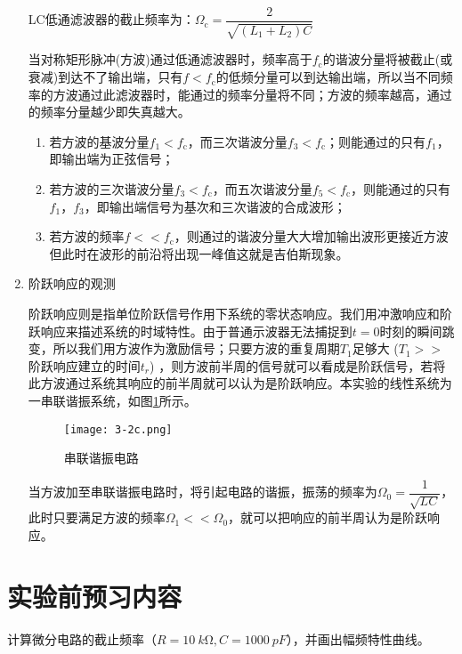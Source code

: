 \begin{enumerate}
		LC低通滤波器的截止频率为：$ \Omega_\text{c}=\dfrac{2}{\sqrt{(L_1+L_2)C}} $

		当对称矩形脉冲(方波)通过低通滤波器时，频率高于$ f_\text{c} $的谐波分量将被截止(或衰减)到达不了输出端，只有$ f<f_\text{c}  $的低频分量可以到达输出端，所以当不同频率的方波通过此滤波器时，能通过的频率分量将不同；方波的频率越高，通过的频率分量越少即失真越大。

		\begin{enumerate}
			\item 若方波的基波分量$ f_1<f_\text{c} $，而三次谐波分量$ f_3<f_\text{c} $；则能通过的只有$ f_1 $，即输出端为正弦信号；
			\item 若方波的三次谐波分量$ f_3<f_\text{c} $，而五次谐波分量$ f_5<f_\text{c} $，则能通过的只有$ f_1 $，$ f_3 $，即输出端信号为基次和三次谐波的合成波形；
			\item 若方波的频率$ f<<f_\text{c} $，则通过的谐波分量大大增加输出波形更接近方波但此时在波形的前沿将出现一峰值这就是吉伯斯现象。
		\end{enumerate}
	\item 阶跃响应的观测

		阶跃响应则是指单位阶跃信号作用下系统的零状态响应。我们用冲激响应和阶跃响应来描述系统的时域特性。由于普通示波器无法捕捉到$ t=0 $时刻的瞬间跳变，所以我们用方波作为激励信号；只要方波的重复周期$ T_1 $足够大 ($ T_1>> $阶跃响应建立的时间$ t_r $) ，则方波前半周的信号就可以看成是阶跃信号，若将此方波通过系统其响应的前半周就可以认为是阶跃响应。本实验的线性系统为一串联谐振系统，如图\ref{fig:串联谐振电路}所示。

		\begin{figure}[htpb]
			\centering
			\texttt{[image: 3-2c.png]}
			\caption{串联谐振电路}
			\label{fig:串联谐振电路}
		\end{figure}

		当方波加至串联谐振电路时，将引起电路的谐振，振荡的频率为$ \Omega_0=\dfrac{1}{\sqrt{LC}} $，此时只要满足方波的频率$ \Omega_1<<\Omega_0 $，就可以把响应的前半周认为是阶跃响应。
\end{enumerate}

\section{实验前预习内容}%
\label{sec:实验前预习内容\arabic{chapter}}

\begin{Exercise}
	计算微分电路的截止频率（$ R=\SI{10}{k\ohm},C=\SI{1000}{pF} $），并画出幅频特性曲线。
\end{Exercise}


